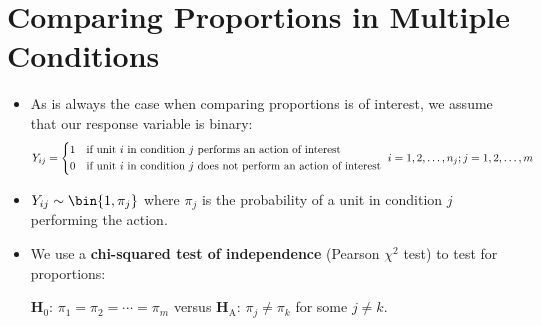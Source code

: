 \section{Comparing Proportions in Multiple Conditions}
\begin{itemize}
      \item As is always the case when comparing proportions is of interest, we assume that our response variable
            is binary:
            \[ Y_{ij}=\begin{cases*}
                        1 & if unit $ i $ in condition $ j $ performs an action of interest         \\
                        0 & if unit $ i $ in condition $ j $ does not perform an action of interest
                  \end{cases*}i=1,2,\ldots,n_j;j=1,2,\ldots,m \]
      \item $ Y_{ij}\sim \bin{1,\pi_j} $
            where $ \pi_j $ is the probability of a unit in condition $ j $ performing the action.
      \item We use a \textbf{chi-squared test of independence} (Pearson $ \chi^2 $ test) to test for proportions:
            \begin{tightcenter}
                  $ \mathbf{H}_0 $: $ \pi_1=\pi_2=\cdots=\pi_m $ versus $ \mathbf{H}_\text{A} $: $ \pi_j\ne \pi_k $ for some $ j\ne k $.
            \end{tightcenter}
\end{itemize}
